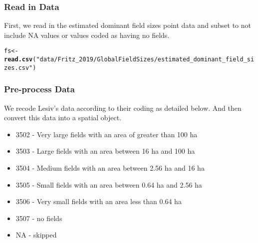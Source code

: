 \documentclass{article}\usepackage[]{graphicx}\usepackage[]{xcolor}
\makeatletter
\newcommand{\hlstr}[1]{\textcolor[rgb]{0.192,0.494,0.8}{#1}}%
\newcommand{\hlstd}[1]{\textcolor[rgb]{0.345,0.345,0.345}{#1}}%
\newcommand{\hlkwb}[1]{\textcolor[rgb]{0.69,0.353,0.396}{#1}}%
\newcommand{\hlkwd}[1]{\textcolor[rgb]{0.737,0.353,0.396}{\textbf{#1}}}%
\newenvironment{kframe}{%
 \def\at@end@of@kframe{}%
 \ifinner\ifhmode%
  \def\at@end@of@kframe{\end{minipage}}%
  \begin{minipage}{\columnwidth}%
 \fi\fi%
 \def\FrameCommand##1{\hskip\@totalleftmargin \hskip-\fboxsep
 \colorbox{shadecolor}{##1}\hskip-\fboxsep
     \hskip-\linewidth \hskip-\@totalleftmargin \hskip\columnwidth}%
 \MakeFramed {\advance\hsize-\width
   \@totalleftmargin\z@ \linewidth\hsize
   \@setminipage}}%
 {\par\unskip\endMakeFramed%
 \at@end@of@kframe}
\newenvironment{knitrout}{}{} %
\makeatother
\begin{document}
\subsubsection{Read in Data}

First, we read in the estimated dominant field sizes point data and subset to not include NA values or values coded as having no fields.
\begin{knitrout}
\color{fgcolor}\begin{kframe}
\begin{alltt}
\hlstd{fs} \hlkwb{<-} \hlkwd{read.csv}\hlstd{(}\hlstr{"data/Fritz_2019/Global Field Sizes/estimated_dominant_field_sizes.csv"}\hlstd{)}
\end{alltt}
\end{kframe}
\end{knitrout}

\subsubsection{Pre-process Data}

We recode Lesiv's data according to their coding as detailed below. And then convert this data into a spatial object.

\begin{itemize}
  \item 3502 - Very large fields with an area of greater than 100 ha
  \item 3503 - Large fields with an area between 16 ha and 100 ha
  \item 3504 - Medium fields with an area between 2.56 ha and 16 ha
  \item 3505 - Small fields with an area between 0.64 ha and 2.56 ha
  \item 3506 - Very small fields with an area less than 0.64 ha
  \item 3507 - no fields
  \item NA - skipped
\end{itemize}
\end{document}
